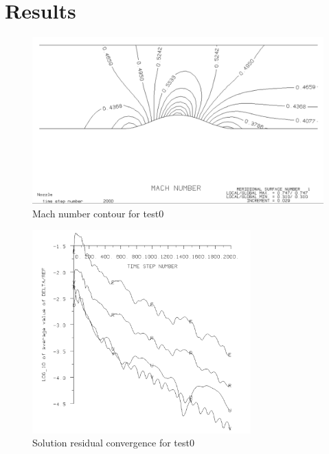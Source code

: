 \documentclass[12pt, a4paper]{article}
\begin{document}

\section{Results}
\begin{figure}[H] %
	\centering
	\includegraphics[width=\textwidth]{0mach}
	\caption{Mach number contour for test0}
	\label{fig:mach0}
\end{figure}
\begin{figure}[H]
	\centering
	\includegraphics[width=0.75\textwidth]{0conv}
	\caption{Solution residual convergence for test0}
	\label{fig:conv0}
\end{figure}
\end{document}
